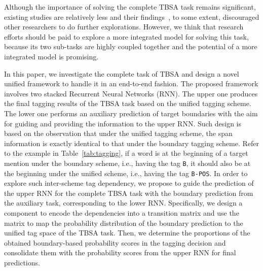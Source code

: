 \documentclass[letterpaper]{article} %
\begin{document}
Although the importance of solving the complete TBSA task remains significant, existing studies are relatively less and their findings~\cite{D13-1171,D15-1073}, to some extent, discouraged other researchers to do further explorations. However, we think that research efforts should be paid to explore a more integrated model for solving this task, because its two sub-tasks are highly coupled together and the potential of a more integrated model is promising.


In this paper, we investigate the complete task of TBSA and design a novel unified framework to handle it in an end-to-end fashion. The proposed framework involves two stacked Recurrent Neural Networks (RNN). The upper one produces the final tagging results of the TBSA task based on the unified tagging scheme. The lower one performs an auxiliary prediction of target boundaries with the aim for guiding and providing the information to the upper RNN.
Such design is based on the observation that under the unified tagging scheme, the span information is exactly identical to that under the boundary tagging scheme. Refer to the example in Table~\ref{tab:tagging}, if a word is at the beginning of a target mention under the boundary scheme, i.e., having the tag \texttt{B}, it should also be at the beginning under the unified scheme, i.e., having the tag \texttt{B-POS}. In order to explore such inter-scheme tag dependency, we propose to guide the prediction of the upper RNN for the complete TBSA task with the boundary prediction from the auxiliary task, corresponding to the lower RNN. Specifically, we design a component to encode the dependencies into a transition matrix and use the matrix to map the probability distribution of the boundary prediction to the unified tag space of the TBSA task. Then, we determine the proportions of the obtained boundary-based probability scores in the tagging decision and consolidate them with the probability scores from the upper RNN for final predictions.
\end{document}
